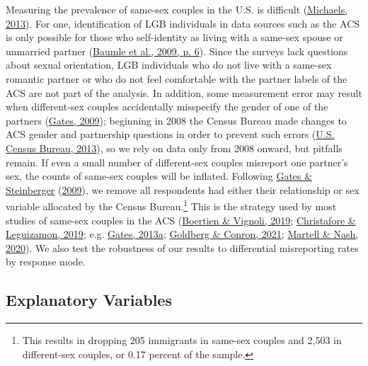 \documentclass[
  11pt,
]{article}
\begin{document}
Measuring the prevalence of same-sex couples in the U.S. is difficult (\protect\hyperlink{ref-michaels_2013}{Michaels, 2013}). For one, identification of LGB individuals in data sources such as the ACS is only possible for those who self-identity as living with a same-sex spouse or unmarried partner (\protect\hyperlink{ref-baumle_2009}{Baumle et al., 2009, p. 6}). Since the surveys lack questions about sexual orientation, LGB individuals who do not live with a same-sex romantic partner or who do not feel comfortable with the partner labels of the ACS are not part of the analysis. In addition, some measurement error may result when different-sex couples accidentally misspecify the gender of one of the partners (\protect\hyperlink{ref-gates_2009a}{Gates, 2009}); beginning in 2008 the Census Bureau made changes to ACS gender and partnership questions in order to prevent such errors (\protect\hyperlink{ref-u.s.censusbureau_2013}{U.S. Census Bureau, 2013}), so we rely on data only from 2008 onward, but pitfalls remain. If even a small number of different-sex couples misreport one partner's sex, the counts of same-sex couples will be inflated. Following \protect\hyperlink{ref-gates_2009}{Gates \& Steinberger} (\protect\hyperlink{ref-gates_2009}{2009}), we remove all respondents had either their relationship or sex variable allocated by the Census Bureau.\footnote{This results in dropping 205 immigrants in same-sex couples and 2,503 in different-sex couples, or 0.17 percent of the sample.} This is the strategy used by most studies of same-sex couples in the ACS (\protect\hyperlink{ref-boertien_2019}{Boertien \& Vignoli, 2019}; \protect\hyperlink{ref-christafore_2019}{Christafore \& Leguizamon, 2019}; e.g. \protect\hyperlink{ref-gates_2013}{Gates, 2013a}; \protect\hyperlink{ref-goldberg_2021}{Goldberg \& Conron, 2021}; \protect\hyperlink{ref-martell_2020}{Martell \& Nash, 2020}). We also test the robustness of our results to differential misreporting rates by response mode.

\hypertarget{explanatory-variables}{%
\subsection{Explanatory Variables}\label{explanatory-variables}}
\end{document}
